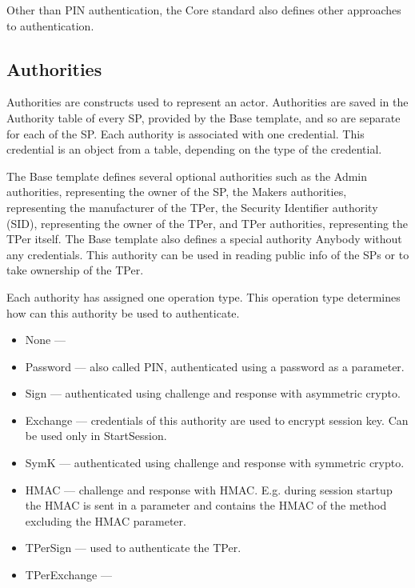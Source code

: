 Other than PIN authentication, the Core standard also defines other approaches to authentication.

\subsection{Authorities}

Authorities are constructs used to represent an actor. Authorities are saved in the Authority table of every SP, provided by the Base template, and so are separate for each of the SP. Each authority is associated with one credential. This credential is an object from a table, depending on the type of the credential.

The Base template defines several optional authorities such as the Admin authorities, representing the owner of the SP, the Makers authorities, representing the manufacturer of the TPer, the Security Identifier authority (SID), representing the owner of the TPer, and TPer authorities, representing the TPer itself.
The Base template also defines a special authority Anybody without any credentials. This authority can be used in reading public info of the SPs or to take ownership of the TPer.


Each authority has assigned one operation type. This operation type determines how can this authority be used to authenticate.
\begin{itemize}
    \item None --- 
    \item Password --- also called PIN, authenticated using a password as a parameter.
    \item Sign --- authenticated using challenge and response with asymmetric crypto.
    \item Exchange --- credentials of this authority are used to encrypt session key. Can be used only in StartSession.
    \item SymK --- authenticated using challenge and response with symmetric crypto.
    \item HMAC --- challenge and response with HMAC. E.g. during session startup the HMAC is sent in a parameter and contains the HMAC of the method excluding the HMAC parameter.
    \item TPerSign --- used to authenticate the TPer.
    \item TPerExchange --- 
\end{itemize}


